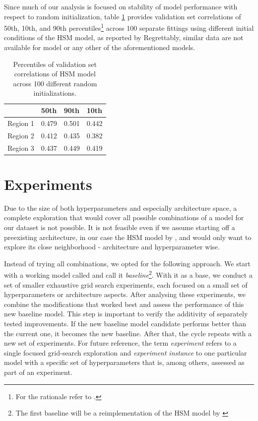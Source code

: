 Since much of our analysis is focused on stability of model performance with respect to random initialization, table \ref{tab:4.3} provides validation set correlations of 50th, 10th, and 90th percentiles\footnote{For the rationale refer to .} across 100 separate fittings using different initial conditions of the HSM model, as reported by \citeauthor{antolik} Regrettably, similar data are not available for \citeauthor{klindt} model or any other of the aforementioned models.

\begin{table}[ht]
    \renewcommand{\arraystretch}{1.0}
    \centering
    \begin{tabular}{l|l|l|l}
        \toprule
        & \textbf{50th} & \textbf{90th} & \textbf{10th} \\ \midrule
        Region 1 & 0.479 & 0.501 & 0.442 \\ 
        Region 2 & 0.412 & 0.435 & 0.382 \\ 
        Region 3 & 0.437 & 0.449 & 0.419 \\ \bottomrule

    \end{tabular}
    \caption[Performance percentiles of HSM model]{Percentiles of validation set correlations of HSM model across 100 different random initializations.}
    \label{tab:4.3}
    \renewcommand{\arraystretch}{1.0}
\end{table}

\section{Experiments}\label{ch:4.2.1}

Due to the size of both hyperparameters and especially architecture space, a complete exploration that would cover all possible combinations of a model for our dataset is not possible. It is not feasible even if we assume starting off a preexisting architecture, in our case the HSM model by \cite{antolik}, and would only want to explore its close neighborhood - architecture and hyperparameter wise. 

Instead of trying all combinations, we opted for the following approach. We start with a working model called and call it \textit{baseline}\footnote{The first baseline will be a reimplementation of the HSM model by \cite{antolik}}. With it as a base, we conduct a set of smaller exhaustive grid search experiments, each focused on a small set of hyperparameters or architecture aspects. After analysing these experiments, we combine the modifications that worked best and assess the performance of this new baseline model. This step is important to verify the additivity of separately tested improvements. If the new baseline model candidate performs better than the current one, it becomes the new baseline. After that, the cycle repeats with a new set of experiments. For future reference, the term \textit{experiment} refers to a single focused grid-search exploration and \textit{experiment instance} to one particular model with a specific set of hyperparameters that is, among others, assessed as part of an experiment.

